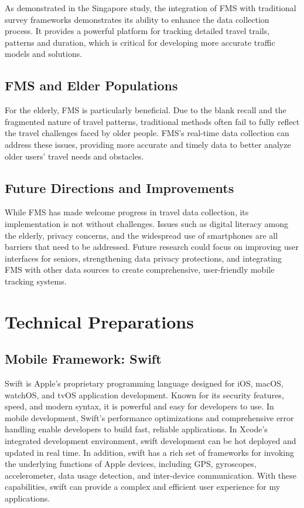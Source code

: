 \documentclass[12pt,two side]{report}
\begin{document}
As demonstrated in the Singapore study, the integration of FMS with traditional survey frameworks demonstrates its ability to enhance the data collection process. It provides a powerful platform for tracking detailed travel trails, patterns and duration, which is critical for developing more accurate traffic models and solutions.
\section{FMS and Elder Populations}
For the elderly, FMS is particularly beneficial. Due to the blank recall and the fragmented nature of travel patterns, traditional methods often fail to fully reflect the travel challenges faced by older people. FMS's real-time data collection can address these issues, providing more accurate and timely data to better analyze older users' travel needs and obstacles.
\section{Future Directions and Improvements}
While FMS has made welcome progress in travel data collection, its implementation is not without challenges. Issues such as digital literacy among the elderly, privacy concerns, and the widespread use of smartphones are all barriers that need to be addressed. Future research could focus on improving user interfaces for seniors, strengthening data privacy protections, and integrating FMS with other data sources to create comprehensive, user-friendly mobile tracking systems.

\chapter{Technical Preparations}
\section{Mobile Framework: Swift}

Swift is Apple's proprietary programming language designed for iOS, macOS, watchOS, and tvOS application development. Known for its security features, speed, and modern syntax, it is powerful and easy for developers to use. In mobile development, Swift's performance optimizations and comprehensive error handling enable developers to build fast, reliable applications. In Xcode's integrated development environment, swift development can be hot deployed and updated in real time. In addition, swift has a rich set of frameworks for invoking the underlying functions of Apple devices, including GPS, gyroscopes, accelerometer, data usage detection, and inter-device communication. With these capabilities, swift can provide a complex and efficient user experience for my applications.
\end{document}
